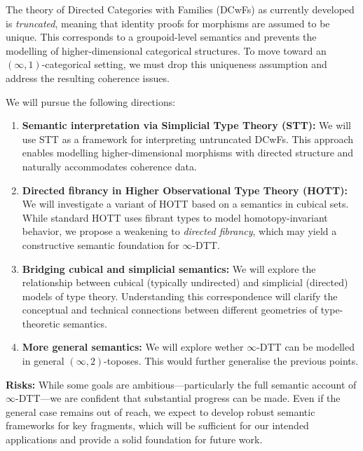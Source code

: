 \documentclass[a4paper,11pt]{article}
\begin{document}
The theory of Directed Categories with Families (DCwFs) as currently
developed is \emph{truncated}, meaning that identity proofs for
morphisms are assumed to be unique. This corresponds to a
groupoid-level semantics and prevents the modelling of
higher-dimensional categorical structures. To move toward an
$(\infty,1)$-categorical setting, we must drop this uniqueness assumption
and address the resulting coherence issues. 

We will pursue the following directions:

\begin{enumerate}
\item \textbf{Semantic interpretation via Simplicial Type Theory
    (STT):} We will use STT as a framework for interpreting
  untruncated DCwFs. This approach enables modelling
  higher-dimensional morphisms with directed structure and naturally
  accommodates coherence data. 

\item \textbf{Directed fibrancy in Higher Observational Type Theory
    (HOTT):} We will investigate a variant of HOTT based on a
  semantics in cubical sets. While standard HOTT uses fibrant types to
  model homotopy-invariant behavior, we propose a weakening to
  \emph{directed fibrancy}, which may yield a constructive semantic
  foundation for $\infty$-DTT. 

\item \textbf{Bridging cubical and simplicial semantics:} We will
  explore the relationship between cubical (typically undirected) and
  simplicial (directed) models of type theory. Understanding this
  correspondence will clarify the conceptual and technical connections
  between different geometries of type-theoretic semantics.

\item \textbf{More general semantics:} We will explore wether
  $\infty$-DTT can be modelled in general $(\infty,2)$-toposes. This
  would further generalise the previous points.
  
\end{enumerate}

\textbf{Risks:} While some goals are ambitious—particularly the full
semantic account of $\infty$-DTT—we are confident that substantial
progress can be made. Even if the general case remains out of reach,
we expect to develop robust semantic frameworks for key fragments,
which will be sufficient for our intended applications and provide a
solid foundation for future work.
\end{document}
